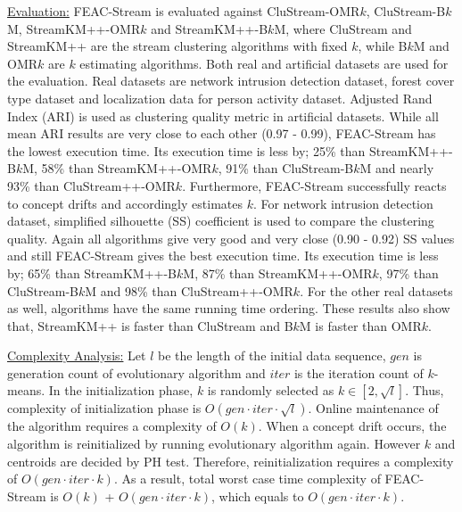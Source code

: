 \documentclass[smallcondensed]{svjour3}     %
\begin{document}
\underline{Evaluation:} FEAC-Stream is evaluated against CluStream-OMR$k$, CluStream-B$k$M, StreamKM++-OMR$k$ and StreamKM++-B$k$M, where CluStream and StreamKM++ are the stream clustering algorithms with fixed $k$, while B$k$M and OMR$k$ are $k$ estimating algorithms. Both real and artificial datasets are used for the evaluation. Real datasets are network intrusion detection dataset, forest cover type dataset and localization data for person activity dataset. Adjusted Rand Index (ARI) is used as clustering quality metric in artificial datasets. While all mean ARI results are very close to each other (0.97 - 0.99), FEAC-Stream has the lowest execution time. Its execution time is less by; 25\% than StreamKM++-B$k$M, 58\% than StreamKM++-OMR$k$, 91\% than CluStream-B$k$M and nearly 93\% than CluStream++-OMR$k$. Furthermore, FEAC-Stream successfully reacts to concept drifts and accordingly estimates $k$. For network intrusion detection dataset, simplified silhouette (SS) coefficient is used to compare the clustering quality. Again all algorithms give very good and very close (0.90 - 0.92) SS values and still FEAC-Stream gives the best execution time. Its execution time is less by; 65\% than StreamKM++-B$k$M, 87\% than StreamKM++-OMR$k$, 97\% than CluStream-B$k$M and 98\% than CluStream++-OMR$k$. For the other real datasets as well, algorithms have the same running time ordering. These results also show that, StreamKM++ is faster than CluStream and B$k$M is faster than OMR$k$.

\underline{Complexity Analysis:} Let $l$ be the length of the initial data sequence, $gen$ is generation count of evolutionary algorithm and $iter$ is the iteration count of $k$-means. In the initialization phase, $k$ is randomly selected as $k \in [2, \sqrt{l}]$. Thus, complexity of initialization phase is $O(gen \cdot iter \cdot \sqrt{l})$. Online maintenance of the algorithm requires a complexity of $O(k)$. When a concept drift occurs, the algorithm is reinitialized by running evolutionary algorithm again. However $k$ and centroids are decided by PH test. Therefore, reinitialization requires a complexity of $O(gen \cdot iter \cdot k)$. As a result, total worst case time complexity of FEAC-Stream is $O(k)$ + $O(gen \cdot iter \cdot k)$, which equals to $O(gen \cdot iter \cdot k)$.
\end{document}
